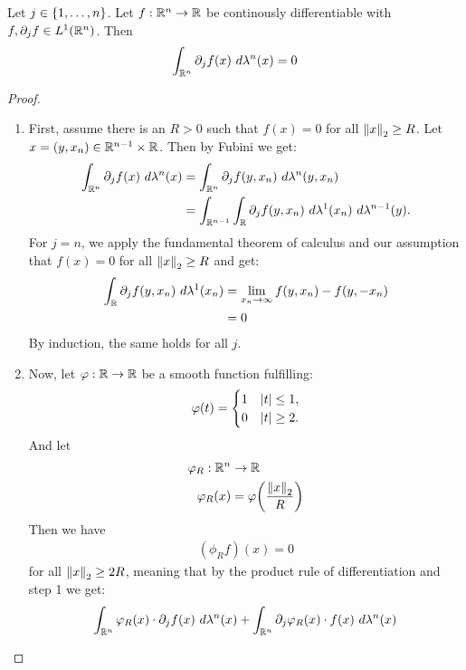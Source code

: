 \begin{importantlemma}{}{}
	Let $j \in \qty{1, \hdots, n}$. Let $f : \mathbb{R}^n \to \mathbb{R}$ be continously differentiable with $f, \partial_j f \in L^1(\mathbb{R}^n)$. Then
	\begin{align*}
		\int_{\mathbb{R}^n} \partial_j f(x) ~d\lambda^n(x) = 0
	\end{align*}
\end{importantlemma}
\begin{proof}
	\begin{enumerate}
		\item First, assume there is an $R > 0$ such that $f(x) = 0$ for all $\norm{x}_2 \geq R$. Let $x = (y, x_n) \in \mathbb{R}^{n-1} \times \mathbb{R}$. Then by Fubini we get:
		\begin{align*}
			\int_{\mathbb{R}^n} \partial_j f(x) ~d\lambda^n(x) 
			&=
			\int_{\mathbb{R}^n} \partial_j f(y, x_n) ~d\lambda^n(y, x_n)\\
			&= \int_{\mathbb{R}^{n-1}} \int_{\mathbb{R}} \partial_j f(y, x_n) ~d\lambda^1(x_n) ~d\lambda^{n-1}(y).
		\end{align*}
		For $j = n$, we apply the fundamental theorem of calculus and our assumption that $f(x) = 0$ for all $\norm{x}_2 \geq R$ and get:
		\begin{align*}
			\int_{\mathbb{R}} \partial_j f(y, x_n) ~d\lambda^1(x_n)
			&= \lim_{x_n \to \infty} f(y,x_n) - f(y,-x_n)\\
			&= 0
		\end{align*}
		By induction, the same holds for all $j$.
		\item Now, let $\varphi : \mathbb{R} \to \mathbb{R}$ be a smooth function fulfilling:
		\begin{align*}
			\varphi(t)
			=
			\begin{cases}
				1 & \abs{t} \leq 1,\\
				0 & \abs{t} \geq 2.
			\end{cases}
		\end{align*}
		And let
		\begin{align*}
			\varphi_R : \mathbb{R}^n &\to \mathbb{R}\\
			\varphi_R(x) &= \varphi\qty(\frac{\norm{x}_2}{R})
		\end{align*}
		Then we have
		\begin{align*}
			(\phi_R f)(x) = 0
		\end{align*}
		for all $\norm{x}_2 \geq 2R$, meaning that by the product rule of differentiation and step 1 we get:
		\begin{align*}
			\int_{\bR^n} \phi_R(x) \cdot \partial_j f(x) ~d\lambda^n(x)
			&+
			\int_{\bR^n} \partial_j \phi_R(x) \cdot f(x) ~d\lambda^n(x)\\

\end{align*}
\end{enumerate}
\end{proof}
